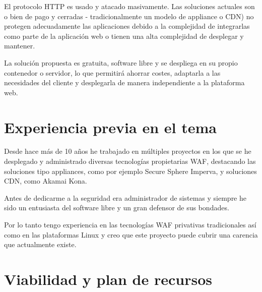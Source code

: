 \par El protocolo HTTP es usado y atacado masivamente. Las soluciones actuales son o bien de pago y cerradas -
tradicionalmente un modelo de appliance o CDN) no protegen adecuadamente las a\-pli\-ca\-cio\-nes debido a la complejidad de
integrarlas como parte de la aplicación web o tienen una alta complejidad de desplegar y mantener.
\par La solución propuesta es gratuita, software libre y se despliega en su propio contenedor o servidor, lo
que permitirá ahorrar costes, adaptarla a las necesidades del cliente y desplegarla de manera in\-de\-pen\-dien\-te a la
plataforma web.

\section{Experiencia previa en el tema}
\par Desde hace más de 10 años he trabajado en múltiples proyectos en los que se he desplegado y administrado
diversas tecnologías propietarias WAF, destacando las soluciones tipo appliances, como por ejemplo Secure Sphere
Imperva, y soluciones CDN, como Akamai Kona.
\par Antes de dedicarme a la seguridad era administrador de sistemas y siempre he sido un entusiasta del software
libre y un gran defensor de sus bondades.
\par Por lo tanto tengo experiencia en las tecnologías WAF privativas tradicionales así como en las plataformas
Linux y creo que este proyecto puede cubrir una carencia que actualmente existe.

\section{Viabilidad y plan de recursos}
